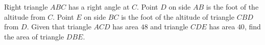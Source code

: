 Right triangle $ABC$ has a right angle at $C$. Point $D$ on side $AB$ is the foot of the altitude from $C$. Point $E$ on side $BC$ is the foot of the altitude of triangle $CBD$ from $D$. Given that triangle $ACD$ has area $48$ and triangle $CDE$ has area $40$, find the area of triangle $DBE$.

